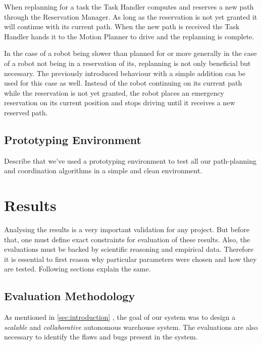 \documentclass[journal]{IEEEtran}
\newcommand{\compref}[1]{\autoref{#1} \nameref{#1}}
\begin{document}
When replanning for a task the Task Handler computes and reserves a new path through the Reservation Manager.
As long as the reservation is not yet granted it will continue with its current path.
When the new path is received the Task Handler hands it to the Motion Planner to drive and the replanning is complete.

In the case of a robot being slower than planned for or more generally in the case of a robot not being in a reservation of its, replanning is not only beneficial but necessary.
The previously introduced behaviour with a simple addition can be used for this case as well. Instead of the robot continuing on its current path while the reservation is not yet granted, the robot places an emergency reservation on its current position and stops driving until it receives a new reserved path.

\subsection{Prototyping Environment}
\label{subsec:prototyping_environment}
Describe that we've used a prototyping environment to test all our path-planning and coordination algorithms in a simple and clean environment.

\section{Results}
\label{sec:results}
Analysing the results is a very important validation for any project. But before that, one must define exact constraints for evaluation of these results. Also, the evaluations must be backed by scientific reasoning and empirical data. Therefore it is essential to first reason why particular parameters were chosen and how they are tested. Following sections explain the same.

\subsection{Evaluation Methodology}
\label{evaluation_methodology}
As mentioned in \compref{sec:introduction}, the goal of our system was to design a \textit{scalable} and \textit{collaborative} autonomous warehouse system. The evaluations are also necessary to identify the flaws and bugs present in the system.
\end{document}
